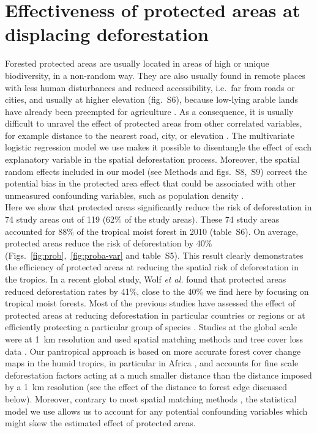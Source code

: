 \documentclass[
  12pt,
]{article}
\begin{document}
\hypertarget{effectiveness-of-protected-areas-at-displacing-deforestation}{%
\section{Effectiveness of protected areas at displacing deforestation}\label{effectiveness-of-protected-areas-at-displacing-deforestation}}

Forested protected areas are usually located in areas of high or unique biodiversity, in a non-random way. They are also usually found in remote places with less human disturbances and reduced accessibility, i.e.~far from roads or cities, and usually at higher elevation (fig.~S6), because low-lying arable lands have already been preempted for agriculture \citep{Geist2002}. As a consequence, it is usually difficult to unravel the effect of protected areas from other correlated variables, for example distance to the nearest road, city, or elevation \citep{Andam2008}. The multivariate logistic regression model we use makes it possible to disentangle the effect of each explanatory variable in the spatial deforestation process. Moreover, the spatial random effects included in our model (see Methods and figs.~S8,~S9) correct the potential bias in the protected area effect that could be associated with other unmeasured confounding variables, such as population density \citep{Andam2008}.\\

Here we show that protected areas significantly reduce the risk of deforestation in 74 study areas out of 119 (62\% of the study areas). These 74 study areas accounted for 88\% of the tropical moist forest in 2010 (table~S6). On average, protected areas reduce the risk of deforestation by 40\% (Figs.~\ref{fig:prob},~\ref{fig:proba-var} and table~S5). This result clearly demonstrates the efficiency of protected areas at reducing the spatial risk of deforestation in the tropics. In a recent global study, Wolf \emph{et al.} \citep{Wolf2021} found that protected areas reduced deforestation rates by 41\%, close to the 40\% we find here by focusing on tropical moist forests. Most of the previous studies have assessed the effect of protected areas at reducing deforestation in particular countries or regions \citep{Andam2008, Bruner2001} or at efficiently protecting a particular group of species \citep{Cazalis2020}. Studies at the global scale \citep{Wolf2021, Yang2021} were at 1~km resolution and used spatial matching methods and tree cover loss data \citep{Hansen2013}. Our pantropical approach is based on more accurate forest cover change maps in the humid tropics, in particular in Africa \citep{Vancutsem2021}, and accounts for fine scale deforestation factors acting at a much smaller distance than the distance imposed by a 1~km resolution (see the effect of the distance to forest edge discussed below). Moreover, contrary to most spatial matching methods \citep{Andam2008, Schleicher2019}, the statistical model we use allows us to account for any potential confounding variables which might skew the estimated effect of protected areas.\\
\end{document}
